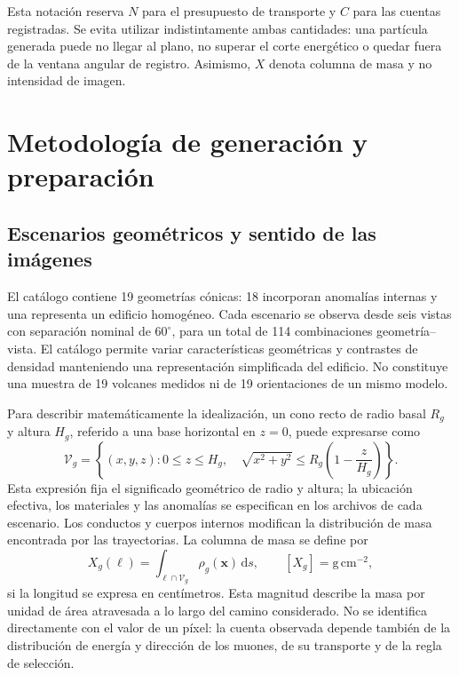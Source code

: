 \documentclass[11pt,a4paper]{article}
\begin{document}
Esta notación reserva $N$ para el presupuesto de transporte y $C$ para las cuentas registradas. Se evita utilizar indistintamente ambas cantidades: una partícula generada puede no llegar al plano, no superar el corte energético o quedar fuera de la ventana angular de registro. Asimismo, $X$ denota columna de masa y no intensidad de imagen.

\section{Metodología de generación y preparación}
\label{sec:metodologia}

\subsection{Escenarios geométricos y sentido de las imágenes}

El catálogo contiene 19 geometrías cónicas: 18 incorporan anomalías internas y una representa un edificio homogéneo. Cada escenario se observa desde seis vistas con separación nominal de $60^\circ$, para un total de 114 combinaciones geometría--vista. El catálogo permite variar características geométricas y contrastes de densidad manteniendo una representación simplificada del edificio. No constituye una muestra de 19 volcanes medidos ni de 19 orientaciones de un mismo modelo.

Para describir matemáticamente la idealización, un cono recto de radio basal $R_g$ y altura $H_g$, referido a una base horizontal en $z=0$, puede expresarse como
\begin{equation}
 \mathcal V_g=\left\{(x,y,z):0\leq z\leq H_g,\quad
 \sqrt{x^2+y^2}\leq R_g\left(1-\frac{z}{H_g}\right)\right\}.
\end{equation}
Esta expresión fija el significado geométrico de radio y altura; la ubicación efectiva, los materiales y las anomalías se especifican en los archivos de cada escenario. Los conductos y cuerpos internos modifican la distribución de masa encontrada por las trayectorias. La columna de masa se define por
\begin{equation}
 X_g(\ell)=\int_{\ell\cap\mathcal V_g}\rho_g(\boldsymbol{x})\,\mathrm ds,
 \qquad [X_g]=\mathrm{g\,cm^{-2}},
 \label{eq:columna}
\end{equation}
si la longitud se expresa en centímetros. Esta magnitud describe la masa por unidad de área atravesada a lo largo del camino considerado. No se identifica directamente con el valor de un píxel: la cuenta observada depende también de la distribución de energía y dirección de los muones, de su transporte y de la regla de selección.
\end{document}
